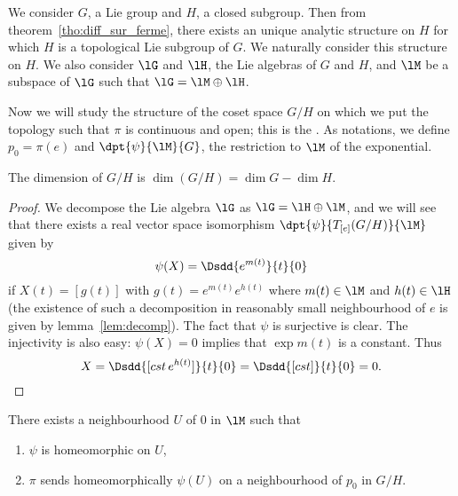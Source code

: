 We consider $G$, a Lie group and $H$, a closed subgroup. Then from theorem~\ref{tho:diff_sur_ferme},  there exists an unique analytic structure on $H$ for which $H$ is a topological Lie subgroup of $G$. We naturally consider this structure on $H$. We also consider $\lG$ and $\lH$, the Lie algebras of $G$ and $H$, and $\lM$ be a subspace of $\lG$ such that $\lG=\lM\oplus\lH$.

Now we will study the structure of the coset space $G/H$ on which we put the topology such that $\pi$ is continuous and open; this is the \label{pg:natur_topo}. As notations, we define $p_0=\pi(e)$ and $\dpt{\psi}{\lM}{G}$, the restriction to $\lM$ of the exponential.

\begin{lemma}
The dimension of $G/H$ is $\dim (G/H)=\dim G-\dim H$.
 \label{lem:dim_G_H}
\end{lemma}

\begin{proof}
We decompose the Lie algebra $\lG$ as $\lG=\lH\oplus\lM$, and we will see that there exists a real vector space isomorphism $\dpt{\psi}{T_{[e]}(G/H)}{\lM}$ given by
\begin{equation}
   \psi(X)=\Dsdd{ e^{m(t)} }{t}{0}
\end{equation}
if $X(t)=[g(t)]$ with $g(t)=e^{m(t)}e^{h(t)}$ where $m(t)\in\lM$ and $h(t)\in\lH$ (the existence of such a decomposition in reasonably small neighbourhood of $e$ is given by lemma~\ref{lem:decomp}). The fact that $\psi$ is surjective is clear. The injectivity is also easy: $\psi(X)=0$ implies that $\exp m(t)$ is a constant. Thus
\[
X=\Dsdd{ [cst\, e^{h(t)}] }{t}{0}=\Dsdd{[cst]}{t}{0}=0.
\]

\end{proof}

\begin{lemma} \label{lem:vois_U}
There exists a neighbourhood $U$ of $0$ in $\lM$ such that
 \begin{enumerate}
 \item $\psi$ is homeomorphic on $U$,
 \item $\pi$ sends homeomorphically $\psi(U)$ on a neighbourhood of $p_0$ in $G/H$.
 \end{enumerate}
\end{lemma}


